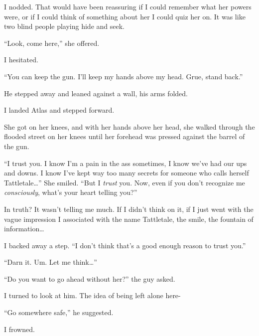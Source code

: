 I nodded.  That would have been reassuring if I could remember what her powers were, or if I could think of something about her I could quiz her on.  It was like two blind people playing hide and seek.



``Look, come here,'' she offered.



I hesitated.



``You can keep the gun.  I'll keep my hands above my head.  Grue, stand back.''



He stepped away and leaned against a wall, his arms folded.



I landed Atlas and stepped forward.



She got on her knees, and with her hands above her head, she walked through the flooded street on her knees until her forehead was pressed against the barrel of the gun.



``I trust you.  I know I'm a pain in the ass sometimes, I know we've had our ups and downs.  I know I've kept way too many secrets for someone who calls herself Tattletale\ldots'' She smiled. ``But I \emph{trust} you.  Now, even if you don't recognize me \emph{consciously}, what's your heart telling you?''



In truth?  It wasn't telling me much.  If I didn't think on it, if I just went with the vague impression I associated with the name Tattletale, the smile, the fountain of information\ldots



I backed away a step.  ``I don't think that's a good enough reason to trust you.''



``Darn it.  Um.  Let me think\ldots''



``Do you want to go ahead without her?'' the guy asked.



I turned to look at him.  The idea of being left alone here-



``Go somewhere safe,'' he suggested.



I frowned.



